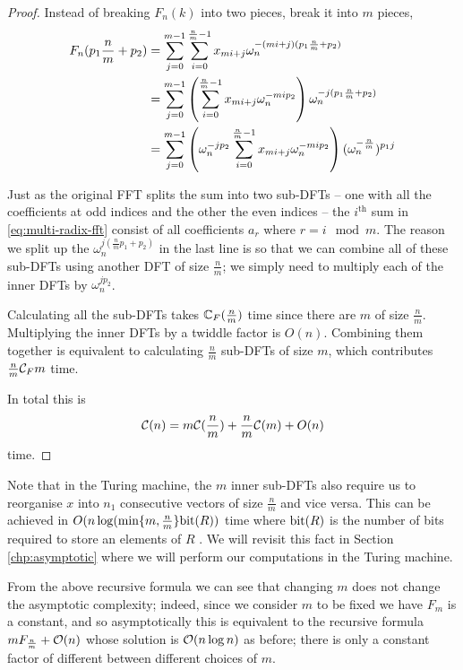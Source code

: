 \begin{proof}
    Instead of breaking $F_n(k)$ into two pieces, break it into $m$ pieces,
    \begin{align}
        F_n(p_1\frac{n}{m} + p_2) 
        &= \sum^{m-1}_{j=0} \sum^{\frac{n}{m}-1}_{i=0} x_{mi + j}\omega_n^{-(mi + j)(p_1 \frac{n}{m} + p_2)}\\ \nonumber
        &= \sum^{m-1}_{j=0} \left(\sum^{\frac{n}{m}-1}_{i=0} x_{mi + j}\omega_n^{-mi p_2}\right) \omega_n^{-j(p_1\frac{n}{m} + p_2)}\\\nonumber
        &= \sum^{m-1}_{j=0} \left(\omega_n^{-jp_2}\sum^{\frac{n}{m}-1}_{i=0} x_{mi + j}\omega_n^{-mi p_2}\right) (\omega_n^{-\frac{n}{m}})^{p_1 j} \label{eq:multi-radix-fft}
    \end{align}

    Just as the original FFT splits the sum into two sub-DFTs -- one with all the coefficients at odd indices and the other the even indices -- the $i^{\text{th}}$ sum in \eqref{eq:multi-radix-fft} consist of all coefficients $a_r$ where $r = i \mod m$. The reason we split up the $\omega_n^{j(\frac{n}{m}p_1 + p_2)}$ in the last line is so that we can combine all of these sub-DFTs using another DFT of size $\frac{n}{m}$; we simply need to multiply each of the inner DFTs by $\omega_n^{jp_2}$.

    Calculating all the sub-DFTs takes ${\mathbb C}_F(\frac{n}{m})$ time since there are $m$ of size $\frac{n}{m}$. Multiplying the inner DFTs by a twiddle factor is $O(n)$. Combining them together is equivalent to calculating $\frac{n}{m}$ sub-DFTs of size $m$, which contributes $\frac{n}{m}\mathcal C_F{m}$ time.

    In total this is
    \[
        \mathcal C(n) = m\mathcal C(\frac{n}{m}) + \frac{n}{m}\mathcal C(m) + O(n)
    \]
    time.
\end{proof}

Note that in the Turing machine, the $m$ inner sub-DFTs also require us to reorganise $x$ into $n_1$ consecutive vectors of size $\frac{n}{m}$ and vice versa. This can be achieved in $O(n \log( \min \{m, \frac{n}{m}\}\textrm{bit}(R))$ time where $\textrm{bit}(R)$ is the number of bits required to store an elements of $R$ \cite{ffnlogn}. We will revisit this fact in Section \ref{chp:asymptotic} where we will perform our computations in the Turing machine.

From the above recursive formula we can see that changing $m$ does not change the asymptotic complexity; indeed, since we consider $m$ to be fixed we have $F_m$ is a constant, and so asymptotically this is equivalent to the recursive formula $mF_{\frac{n}{m}} + \mathcal O(n)$ whose solution is $\mathcal O(n \log n)$ as before; there is only a constant factor of different between different choices of $m$.

